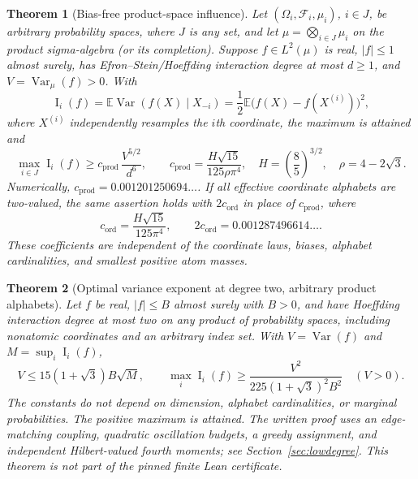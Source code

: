 \documentclass[11pt]{article}
\numberwithin{equation}{section}
\newtheorem{theorem}{Theorem}[section]
\theoremstyle{remark}
\newcommand{\E}{\mathbb E}
\newcommand{\Var}{\operatorname{Var}}
\newcommand{\Inf}{\operatorname{I}}
\newcommand{\cprod}{c_{\mathrm{prod}}}
\newcommand{\cord}{c_{\mathrm{ord}}}
\begin{document}
\begin{theorem}[Bias-free product-space influence]\label{thm:main}
Let $(\Omega_i,\mathcal F_i,\mu_i)$, $i\in J$, be arbitrary probability spaces, where $J$ is any set, and let $\mu=\bigotimes_{i\in J}\mu_i$ on the product sigma-algebra (or its completion). Suppose $f\in L^2(\mu)$ is real, $|f|\le1$ almost surely, has Efron--Stein/Hoeffding interaction degree at most $d\ge1$, and $V=\Var_\mu(f)>0$. With
\begin{equation}\label{eq:influence}
 \Inf_i(f)=\E\Var(f(X)\mid X_{-i})
 =\frac12\E\bigl(f(X)-f(X^{(i)})\bigr)^2,
\end{equation}
where $X^{(i)}$ independently resamples the $i$th coordinate, the maximum is attained and
\begin{equation}\label{eq:headline}
 \max_{i\in J}\Inf_i(f)\ge \cprod\,\frac{V^{5/2}}{d^6},\qquad
 \cprod=\frac{H\sqrt{15}}{125\rho\pi^4},\quad
 H=\left(\frac85\right)^{3/2},\quad \rho=4-2\sqrt3.
\end{equation}
Numerically, $\cprod=0.001201250694\ldots$. If all effective coordinate alphabets are two-valued, the same assertion holds with $2\cord$ in place of $\cprod$, where
\begin{equation}\label{eq:cord}
 \cord=\frac{H\sqrt{15}}{125\pi^4},\qquad 2\cord=0.001287496614\ldots.
\end{equation}
These coefficients are independent of the coordinate laws, biases, alphabet cardinalities, and smallest positive atom masses.
\end{theorem}

\begin{theorem}[Optimal variance exponent at degree two, arbitrary product alphabets]\label{thm:quadall}
Let $f$ be real, $|f|\le B$ almost surely with $B>0$, and have Hoeffding interaction degree at most two on \emph{any} product of probability spaces, including nonatomic coordinates and an arbitrary index set. With $V=\Var(f)$ and $M=\sup_i\Inf_i(f)$,
\begin{equation}\label{eq:quadall}
 V\le 15(1+\sqrt3)B\sqrt M,\qquad
 \max_i\Inf_i(f)\ge\frac{V^2}{225(1+\sqrt3)^2 B^2}\quad(V>0).
\end{equation}
The constants do not depend on dimension, alphabet cardinalities, or marginal probabilities. The positive maximum is attained. The written proof uses an edge-matching coupling, quadratic oscillation budgets, a greedy assignment, and independent Hilbert-valued fourth moments; see Section~\ref{sec:lowdegree}. This theorem is not part of the pinned finite Lean certificate.
\end{theorem}
\end{document}
